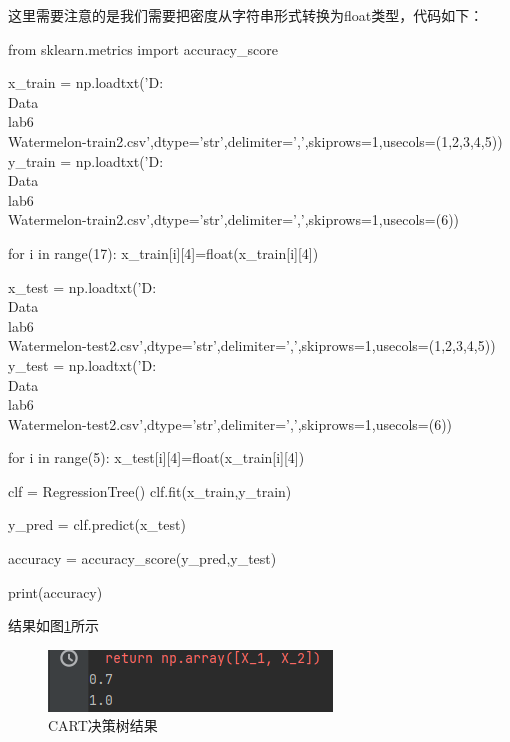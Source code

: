 \documentclass[UTF8,a4paper,10pt]{ctexart}
\begin{document}
这里需要注意的是我们需要把密度从字符串形式转换为float类型，代码如下：

\begin{python}
from sklearn.metrics import accuracy_score

x_train = np.loadtxt('D:\\Data\\lab6\\Watermelon-train2.csv',dtype='str',delimiter=',',skiprows=1,usecols=(1,2,3,4,5))
y_train = np.loadtxt('D:\\Data\\lab6\\Watermelon-train2.csv',dtype='str',delimiter=',',skiprows=1,usecols=(6))

for i in range(17):
    x_train[i][4]=float(x_train[i][4])

x_test = np.loadtxt('D:\\Data\\lab6\\Watermelon-test2.csv',dtype='str',delimiter=',',skiprows=1,usecols=(1,2,3,4,5))
y_test = np.loadtxt('D:\\Data\\lab6\\Watermelon-test2.csv',dtype='str',delimiter=',',skiprows=1,usecols=(6))

for i in range(5):
    x_test[i][4]=float(x_train[i][4])

clf = RegressionTree()
clf.fit(x_train,y_train)


y_pred = clf.predict(x_test)

accuracy = accuracy_score(y_pred,y_test)

print(accuracy)
\end{python}


结果如图\ref{fig:1}所示
\begin{figure}[H]
    \centering
    \includegraphics[scale=0.3]{2.png}
    \caption{CART决策树结果}
    \label{fig:1}
\end{figure}



\end{document}
